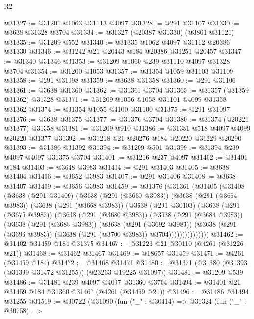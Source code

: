 \begin{lexlean}{R2}
\begin{coremodule}
@31327 := @31201 @1063 @31113 @4097
@31328 := @291 @31107
@31330 := @3638 @31328 @3704
@31334 := @31327 (@20387 @31330) (@3861 @31121)
@31335 := @31209 @552
@31340 := @31335 @1062 @4097 @31112 @20386 @31330
@31346 := @31242 @21 @20443 @184 @20386 @31251 @20457
@31347 := @31340 @31346
@31353 := @31209 @1060 @239 @31110 @4097 @31328 @3704
@31354 := @31200 @1053
@31357 := @31354 @1059 @31103 @31109
@31358 := @291 @31098
@31359 := @3638 @31358
@31360 := @291 @31106
@31361 := @3638 @31360
@31362 := @31361 @3704
@31365 := @31357 (@31359 @31362) @31328
@31371 := @31209 @1056 @1058 @31101 @4099 @31358 @31362
@31374 := @31354 @1055 @4100 @31100
@31375 := @291 @31097
@31376 := @3638 @31375
@31377 := @31376 @3704
@31380 := @31374 (@20221 @31377) @31358
@31381 := @31209 @910
@31386 := @31381 @518 @4097 @4099 @20220 @31377
@31392 := @31218 @21 @20276 @184 @20220 @31229 @20290
@31393 := @31386 @31392
@31394 := @31209 @501
@31399 := @31394 @239 @4097 @4097 @31375 @3704
@31401 := @31216 @237 @4097
@31402 := @31401 @184
@31403 := @3648 @3983
@31404 := @291 @31403
@31405 := @3638 @31404
@31406 := @3652 @3983
@31407 := @291 @31406
@31408 := @3638 @31407
@31409 := @3656 @3983
@31459 := @31376
    (@31361
      (@31405
        (@31408
          (@3638
            (@291 @31409)
            (@3638
              (@291 (@3660 @3983))
              (@3638
                (@291 (@3664 @3983))
                (@3638
                  (@291 (@3668 @3983))
                  (@3638
                    (@291 @30103)
                    (@3638
                      (@291 (@3676 @3983))
                      (@3638
                        (@291 (@3680 @3983))
                        (@3638
                          (@291 (@3684 @3983))
                          (@3638
                            (@291 (@3688 @3983))
                            (@3638
                              (@291 (@3692 @3983))
                              (@3638
                                (@291 (@3696 @3983))
                                (@3638 (@291 (@3700 @3983)) @3704)))))))))))))))
@31462 := @31402 @31459 @184 @31375
@31467 := @31223 @21 @30110 (@4261 (@31226 @21))
@31468 := @31462 @31467
@31469 := @18657 @31459
@31471 := @4261 (@31469 @184)
@31472 := @31468 @31471
@31480 := @31371 (@31380 (@31393 (@31399 @31472 @31255)) (@23263 @19225 @31097))
@31481 := @31209 @539
@31486 := @31481 @239 @4097 @4097 @31360 @3704
@31494 := @31401 @21 @31459 @184 @31360 @31467 (@4261 (@31469 @21))
@31496 := @31486 @31494 @31255
@31519 := @30722
    (@31090
      (fun ("_" : @30414) =>
      @31324
        (fun ("_" : @30758) =>

\end{coremodule}
\end{lexlean}
